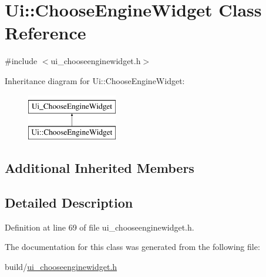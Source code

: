 \hypertarget{classUi_1_1ChooseEngineWidget}{\section{Ui\+:\+:Choose\+Engine\+Widget Class Reference}
\label{classUi_1_1ChooseEngineWidget}
}


{\ttfamily \#include $<$ui\+\_\+chooseenginewidget.\+h$>$}

Inheritance diagram for Ui\+:\+:Choose\+Engine\+Widget\+:\begin{figure}[H]
\begin{center}
\leavevmode
\includegraphics[height=2.000000cm]{classUi_1_1ChooseEngineWidget}
\end{center}
\end{figure}
\subsection*{Additional Inherited Members}


\subsection{Detailed Description}


Definition at line 69 of file ui\+\_\+chooseenginewidget.\+h.



The documentation for this class was generated from the following file\+:\begin{DoxyCompactItemize}
\item 
build/\hyperlink{ui__chooseenginewidget_8h}{ui\+\_\+chooseenginewidget.\+h}\end{DoxyCompactItemize}
